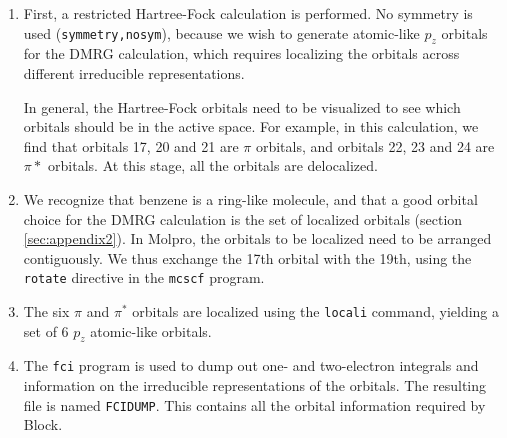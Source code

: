 \documentclass[letterpaper,12pt,aps, pra]{revtex4-1}
\begin{document}
\begin{enumerate}
 \item First, a restricted Hartree-Fock calculation is performed. No symmetry is 
used (\texttt{symmetry,nosym}), because we wish to generate atomic-like $p_z$ orbitals
for the DMRG calculation, which requires localizing the orbitals across different irreducible representations. 

In general, the Hartree-Fock orbitals need to be visualized to see which orbitals should be in the active space. For example, in this calculation, 
we find that orbitals 17, 20 and 21 are $\pi$ orbitals, and orbitals 22, 23 and 24 are $\pi*$ orbitals. 
At this stage, all the orbitals are delocalized.

\item We recognize that benzene is a ring-like molecule, and that a good orbital choice
for the DMRG calculation is the set of localized orbitals (section \ref{sec:appendix2}). In Molpro, the orbitals to be localized need to be arranged
contiguously. We thus exchange the 17th orbital with the 19th, using the \texttt{rotate} directive in the \texttt{mcscf} program. 


\item The six $\pi$ and $\pi^*$ orbitals are localized using the \texttt{locali} command, yielding a set of 6 $p_z$ atomic-like orbitals. 

\item The \texttt{fci} program is used to dump out one- and two-electron integrals and information on the irreducible representations of the orbitals. The resulting file is named \texttt{FCIDUMP}. This contains all the orbital information required by Block.
\end{enumerate}
\end{document}
